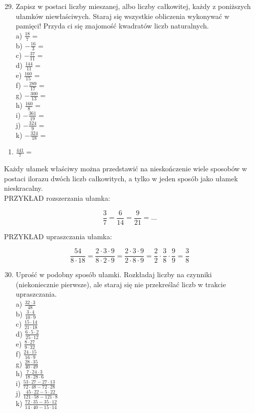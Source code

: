 \documentclass[10pt]{article}
\begin{document}
\begin{enumerate}
  \setcounter{enumi}{28}
  \item Zapisz w postaci liczby mieszanej, albo liczby całkowitej, każdy z poniższych ułamków niewłaściwych. Staraj się wszystkie obliczenia wykonywać w pamięci! Przyda ci się znajomość kwadratów liczb naturalnych.\\
a) \(\frac{18}{7}=\)\\
b) \(-\frac{16}{3}=\)\\
c) \(-\frac{37}{11}=\)\\
d) \(\frac{144}{11}=\)\\
e) \(\frac{160}{15}=\)\\
f) \(-\frac{289}{17}=\)\\
g) \(-\frac{300}{13}=\)\\
h) \(\frac{160}{8}=\)\\
i) \(-\frac{361}{19}=\)\\
j) \(-\frac{324}{9}=\)\\
k) \(-\frac{324}{18}=\)
\end{enumerate}

\begin{enumerate}
  \item \(\frac{441}{7}=\)
\end{enumerate}

Każdy ułamek właściwy można przedstawić na nieskończenie wiele sposobów w postaci ilorazu dwóch liczb całkowitych, a tylko w jeden sposób jako ułamek nieskracalny.\\
PRZYKŁAD rozszerzania ułamka:

\[
\frac{3}{7}=\frac{6}{14}=\frac{9}{21}=\ldots
\]

PRZYKŁAD upraszczania ułamka:

\[
\frac{54}{8 \cdot 18}=\frac{2 \cdot 3 \cdot 9}{8 \cdot 2 \cdot 9}=\frac{2 \cdot 3 \cdot 9}{2 \cdot 8 \cdot 9}=\frac{2}{2} \cdot \frac{3}{8} \cdot \frac{9}{9}=\frac{3}{8}
\]

\begin{enumerate}
  \setcounter{enumi}{29}
  \item Uprość w podobny sposób ułamki. Rozkładaj liczby na czynniki (niekoniecznie pierwsze), ale staraj się nie przekreślać liczb w trakcie upraszczania.\\
a) \(\frac{32 \cdot 3}{48}\)\\
b) \(\frac{3 \cdot 4}{10 \cdot 9}\)\\
c) \(\frac{15 \cdot 14}{21 \cdot 18}\)\\
d) \(\frac{6 \cdot 5 \cdot 2}{25 \cdot 12}\)\\
e) \(\frac{8 \cdot 27}{9 \cdot 32}\)\\
f) \(\frac{24 \cdot 15}{16 \cdot 9}\)\\
g) \(\frac{28 \cdot 35}{40 \cdot 49}\)\\
h) \(\frac{7 \cdot 24 \cdot 3}{18 \cdot 28 \cdot 6}\)\\
i) \(\frac{53 \cdot 27-27 \cdot 13}{72 \cdot 48-72 \cdot 28}\)\\
j) \(\frac{45 \cdot 22-5 \cdot 22}{121 \cdot 58-121 \cdot 8}\)\\
k) \(\frac{72 \cdot 35-35 \cdot 12}{14 \cdot 40-15 \cdot 14}\)
\end{enumerate}
\end{document}

